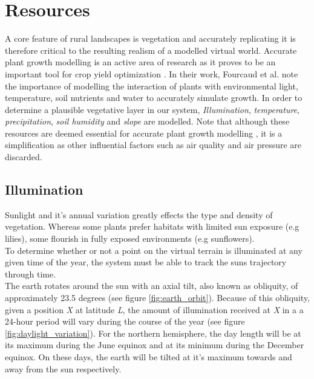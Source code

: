 \section{Resources}

A core feature of rural landscapes is vegetation and accurately replicating it is therefore critical to the resulting realism of a modelled virtual world. Accurate plant growth modelling is an active area of research as it proves to be an important tool for crop yield optimization \cite{Fourcaud2008}. In their work, Fourcaud et al. \cite{Fourcaud2008} note the importance of modelling the interaction of plants with environmental light, temperature, soil nutrients and water to accurately simulate growth. In order to determine a plausible vegetative layer in our system, \textit{Illumination}, \textit{temperature}, \textit{precipitation}, \textit{soil humidity} and \textit{slope} are modelled. Note that although these resources are deemed essential for accurate plant growth modelling \cite{Fourcaud2008}, it is a simplification as other influential factors such as air quality and air pressure are discarded.\\

\subsection{Illumination}

Sunlight and it's annual variation greatly effects the type and density of vegetation. Whereas some plants prefer habitats with limited sun exposure (e.g lilies), some flourish in fully exposed environments (e.g sunflowers). \\
To determine whether or not a point on the virtual terrain is illuminated at any given time of the year, the system must be able to track the suns trajectory through time.\\

The earth rotates around the sun with an axial tilt, also known as obliquity, of approximately 23.5 degrees (see figure \ref{fig:earth_orbit}). Because of this obliquity, given a position \textit{X} at latitude \textit{L}, the amount of illumination received at \textit{X} in a a 24-hour period will vary during the course of the year (see figure \ref{fig:daylight_variation}). For the northern hemisphere, the day length will be at its maximum during the June equinox and at its minimum during the December equinox. On these days, the earth will be tilted at it's maximum towards and away from the sun respectively.\\

